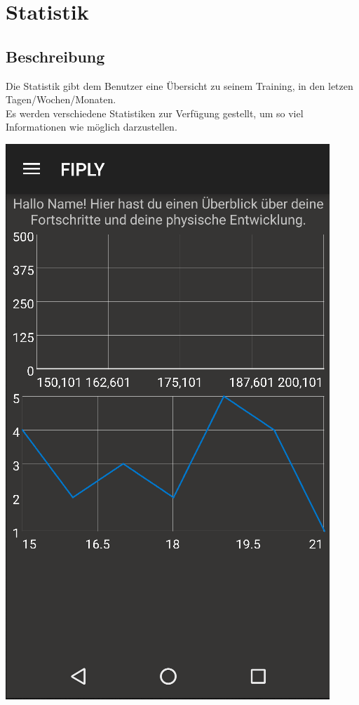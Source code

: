 \documentclass[FIPLY_base.tex]{subfiles}
\begin{document}
\section{Statistik}

\subsection{Beschreibung}
Die Statistik gibt dem Benutzer eine Übersicht zu seinem Training, in den letzen Tagen/Wochen/Monaten. 
\ \\
Es werden verschiedene Statistiken zur Verfügung gestellt, um so viel Informationen wie möglich darzustellen.

\includegraphics[scale=0.5]{img/Statistik}
\end{document}
